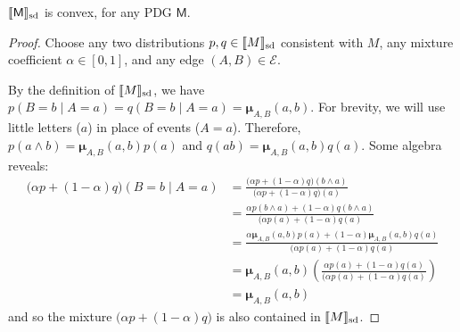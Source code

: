 \documentclass{article}
\newcommand{\bmu}{\boldsymbol{\mu}}
\newcommand{\Ed}{\mathcal E}
\newcommand{\sfM}{\mathsf M}
\newcommand\SD{_{\text{sd}}}
\begin{document}
\begin{lemma}
	\label{lem:convex}
	$\bbr{\sfM}\SD$ is convex, for any PDG  $\sfM$.
\end{lemma}%
\begin{proof}
	Choose any two distributions $p, q \in \bbr{M}\SD$ consistent with $M$, any mixture coefficient $\alpha \in [0,1]$, and any edge $(A,B) \in \Ed$.
	
	By the definition of $\bbr{M}\SD$, we have $p(B = b \mid A = a) = q(B = b \mid A = a) = \bmu_{A,B}(a,b)$.  
	For brevity, we will use little letters ($a$) in place of events ($A = a$).
	Therefore, $p(a\land b) = \bmu_{A,B}(a,b) p(a)$ and $q(ab) = \bmu_{A,B}(a,b) q(a)$. Some algebra reveals:
	\begin{align*}
		\Big( \alpha p + (1-\alpha) q \Big) (B = b \mid A = a) &= 
		\frac{\Big( \alpha p + (1-\alpha) q \Big) (b \land a)}{\Big( \alpha p + (1-\alpha) q \Big) (a)} \\
		&= \frac{ \alpha p(b \land a) + (1-\alpha) q(b \land a) }{\Big( \alpha p(a) + (1-\alpha) q (a)} \\
		&= \frac{ \alpha \bmu_{A,B}(a,b) p(a) + (1-\alpha) \bmu_{A,B}(a,b) q(a) }{\Big( \alpha p(a) + (1-\alpha) q (a)} \\
		&=\bmu_{A,B}(a,b) \left(\frac{ \alpha  p(a) + (1-\alpha) q(a) }{\Big( \alpha p(a) + (1-\alpha) q (a)}\right)\\
		&= \bmu_{A,B}(a,b)
	\end{align*}
	and so the mixture $\Big(\alpha p + (1-\alpha) q \Big)$ is also contained in $\bbr{M}\SD$.
\end{proof}
\end{document}
